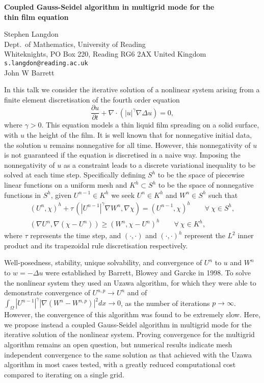 \documentclass{report}
\begin{document}

\begin{center}
{\large
{\bf Coupled Gauss-Seidel algorithm in multigrid mode for the \\
	thin film equation}}

	Stephen Langdon \\
	Dept.~of Mathematics, University of Reading \\
	Whiteknights, PO Box 220, Reading RG6 2AX United Kingdom \\
	{\tt s.langdon@reading.ac.uk} \\
	John W Barrett
\end{center}
In this talk we consider the iterative solution of a
nonlinear system arising from a finite element
discretisation of the fourth order equation \[
\frac{\partial u}{\partial t} + \nabla \cdot
(|u|^{\gamma}\nabla\Delta u) = 0, \] where $\gamma>0$. This
equation models a thin liquid film spreading on a solid
surface, with $u$ the height of the film. It is well known
that for nonnegative initial data, the solution $u$ remains
nonnegative for all time. However, this nonnegativity of $u$
is not guaranteed if the equation is discretised in a naive
way. Imposing the nonnegativity of $u$ as a constraint leads
to a discrete variational inequality to be solved at each
time step. Specifically defining $S^h$ to be the space of
piecewise linear functions on a uniform mesh and $K^h\subset
S^h$ to be the space of nonnegative functions in $S^h$,
given $U^{n-1}\in K^h$ we seek $U^{n} \in K^h$ and $W^n \in
S^h$ such that \begin{eqnarray*} &(U^{n},\chi)^h +
\tau\,(|U^{n-1}|^{\gamma}\nabla W^n,\nabla \chi) =
(U^{n-1},\chi)^h \qquad \forall \ \chi \in S^h,& \\ &(\nabla
U^{n},\nabla (\chi-U^{n})) \geq (W^{n}, \chi-U^n)^h \qquad
\forall \ \chi \in K^h,& \end{eqnarray*} where $\tau$
represents the time step, and $(\cdot,\cdot)$ and
$(\cdot,\cdot)^h$ represent the $L^2$ inner product and its
trapezoidal rule discretisation respectively.


Well-posedness, stability, unique solvability, and
convergence of $U^n$ to $u$ and $W^n$ to $w=-\Delta u$ were
established by Barrett, Blowey and Garcke in 1998. To solve
the nonlinear system they used an Uzawa algorithm, for which
they were able to demonstrate convergence of
$U^{n,p}\rightarrow U^n$ and of $\int_{\Omega}
|U^{n-1}|^{\gamma} |\nabla(W^n-W^{n,p})|^2 dx \rightarrow
0$, as the number of iterations $p\rightarrow\infty$.
However, the convergence of this algorithm was found to be
extremely slow. Here, we propose instead a coupled
Gauss-Seidel algorithm in multigrid mode for the iterative
solution of the nonlinear system. Proving convergence for
the multigrid algorithm remains an open question, but
numerical results indicate mesh independent convergence to
the same solution as that achieved with the Uzawa algorithm
in most cases tested, with a greatly reduced computational
cost compared to iterating on a single grid.



\end{document}
